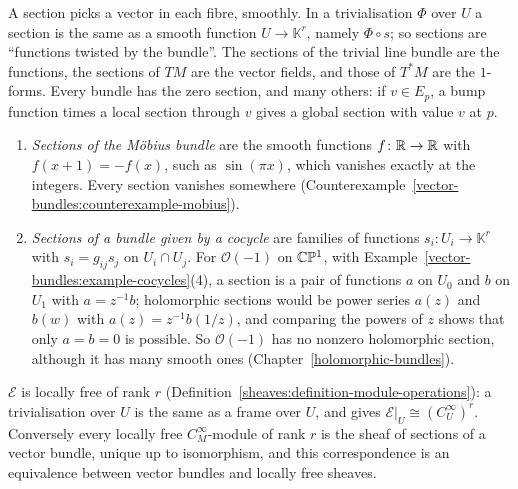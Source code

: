 A section picks a vector in each fibre, smoothly. In a trivialisation $\Phi$ over $U$ a section is the same as a smooth function $U \to \mathbb{K}^r$, namely $\Phi \circ s$; so
sections are ``functions twisted by the bundle''. The sections of the trivial line bundle are the functions, the sections of $TM$ are the vector fields, and those of $T^*M$ are the
$1$-forms. Every bundle has the zero section, and many others: if $v \in E_p$, a bump function times a local section through $v$ gives a global section with value $v$ at $p$.

\begin{example}\label{vector-bundles:example-sections}
\begin{enumerate}
\item \emph{Sections of the M\"obius bundle} are the smooth functions $f \colon \mathbb{R} \to \mathbb{R}$ with $f(x + 1) = -f(x)$, such as $\sin(\pi x)$, which vanishes exactly at the integers.
Every section vanishes somewhere (Counterexample~\ref{vector-bundles:counterexample-mobius}).
\item \emph{Sections of a bundle given by a cocycle} are families of functions $s_i \colon U_i \to \mathbb{K}^r$ with $s_i = g_{ij}s_j$ on $U_i \cap U_j$. For $\mathcal{O}(-1)$ on
$\mathbb{C}\mathbb{P}^1$, with Example~\ref{vector-bundles:example-cocycles}(4), a section is a pair of functions $a$ on $U_0$ and $b$ on $U_1$ with $a = z^{-1}b$; holomorphic sections would be
power series $a(z)$ and $b(w)$ with $a(z) = z^{-1}b(1/z)$, and comparing the powers of $z$ shows that only $a = b = 0$ is possible. So $\mathcal{O}(-1)$ has no nonzero holomorphic
section, although it has many smooth ones (Chapter~\ref{holomorphic-bundles}).
\end{enumerate}
\end{example}

\begin{proposition}\label{vector-bundles:proposition-sheaf-of-sections}
$\mathcal{E}$ is locally free of rank $r$ (Definition~\ref{sheaves:definition-module-operations}): a trivialisation over $U$ is the same as a frame over $U$, and gives $\mathcal{E}|_U \cong (C^\infty_U)^r$.
Conversely every locally free $C^\infty_M$-module of rank $r$ is the sheaf of sections of a vector bundle, unique up to isomorphism, and this correspondence is an equivalence between vector bundles and
locally free sheaves.
\end{proposition}

